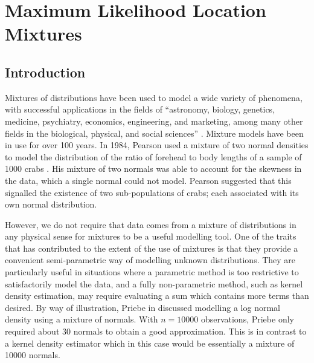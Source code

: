 \chapter{Maximum Likelihood Location Mixtures}
\label{Ch:Mixtures}


\graphicspath{{Figures/Mixtures/}}


\section{Introduction}
	Mixtures of distributions have been used to model a wide variety of phenomena, with successful applications in the fields of ``astronomy, biology, genetics, medicine, psychiatry, economics, engineering, and marketing, among many other fields in the biological, physical, and social sciences'' \cite[Section 1.1.1]{McLachlan2004-ik}. Mixture models have been in use for over 100 years. In 1984, Pearson used a mixture of two normal densities to model the distribution of the ratio of forehead to body lengths of a sample of 1000 crabs \cite{Pearson1894-qv}. His mixture of two normals was able to account for the skewness in the data, which a single normal could not model. Pearson suggested that this signalled the existence of two sub-populations of crabs; each associated with its own normal distribution.

	However, we do not require that data comes from a mixture of distributions in any physical sense for mixtures to be a useful modelling tool. 
	One of the traits that has contributed to the extent of the use of mixtures is that they provide a convenient semi-parametric way of modelling unknown distributions. They are particularly useful in situations where a parametric method is too restrictive to satisfactorily model the data, and a fully non-parametric method, such as kernel density estimation, may require evaluating a sum which contains more terms than desired. By way of illustration, Priebe in \cite{Priebe1994-ng} discussed modelling a log normal density using a mixture of normals. With $n = 10000$ observations, Priebe only required about 30 normals to obtain a good approximation. This is in contrast to a kernel density estimator which in this case would be essentially a mixture of 10000 normals.

